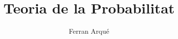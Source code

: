 \documentclass[12pt]{article}
\theoremstyle{normal}
\theoremstyle{break}
\theoremstyle{breakthm}
\begin{document}
\date{}
\setlength{\parindent}{0pt}

\title{Teoria de la Probabilitat}
\author{Ferran Arqué}
 
\maketitle

\tableofcontents

\setcounter{section}{0}

\newpage

\newpage

\newpage

\newpage

\newpage

\newpage

\end{document}
